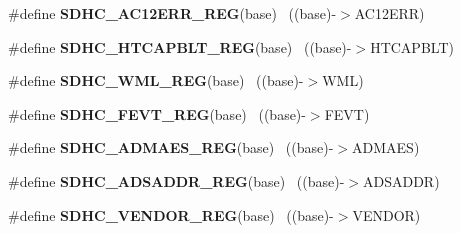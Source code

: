 \begin{DoxyCompactItemize}
\item 
\hypertarget{group___s_d_h_c___register___accessor___macros_ga56d37151a36eb2336bf5018e20649d1b}{}\#define {\bfseries S\+D\+H\+C\+\_\+\+A\+C12\+E\+R\+R\+\_\+\+R\+E\+G}(base)                                  ~((base)-\/$>$A\+C12\+E\+R\+R)\label{group___s_d_h_c___register___accessor___macros_ga56d37151a36eb2336bf5018e20649d1b}

\item 
\hypertarget{group___s_d_h_c___register___accessor___macros_gace7cb34c06d08883a5fcc5e09b5fef2e}{}\#define {\bfseries S\+D\+H\+C\+\_\+\+H\+T\+C\+A\+P\+B\+L\+T\+\_\+\+R\+E\+G}(base)                                ~((base)-\/$>$H\+T\+C\+A\+P\+B\+L\+T)\label{group___s_d_h_c___register___accessor___macros_gace7cb34c06d08883a5fcc5e09b5fef2e}

\item 
\hypertarget{group___s_d_h_c___register___accessor___macros_ga0de53147f91ba1d4d621071009e52543}{}\#define {\bfseries S\+D\+H\+C\+\_\+\+W\+M\+L\+\_\+\+R\+E\+G}(base)                                          ~((base)-\/$>$W\+M\+L)\label{group___s_d_h_c___register___accessor___macros_ga0de53147f91ba1d4d621071009e52543}

\item 
\hypertarget{group___s_d_h_c___register___accessor___macros_ga4cb98ec5c899da9be7c700ec54537a05}{}\#define {\bfseries S\+D\+H\+C\+\_\+\+F\+E\+V\+T\+\_\+\+R\+E\+G}(base)                                        ~((base)-\/$>$F\+E\+V\+T)\label{group___s_d_h_c___register___accessor___macros_ga4cb98ec5c899da9be7c700ec54537a05}

\item 
\hypertarget{group___s_d_h_c___register___accessor___macros_gab2958cbf71492c8796d3a6d6393d633a}{}\#define {\bfseries S\+D\+H\+C\+\_\+\+A\+D\+M\+A\+E\+S\+\_\+\+R\+E\+G}(base)                                    ~((base)-\/$>$A\+D\+M\+A\+E\+S)\label{group___s_d_h_c___register___accessor___macros_gab2958cbf71492c8796d3a6d6393d633a}

\item 
\hypertarget{group___s_d_h_c___register___accessor___macros_gae32c413fbc608f59a73a1298495f020e}{}\#define {\bfseries S\+D\+H\+C\+\_\+\+A\+D\+S\+A\+D\+D\+R\+\_\+\+R\+E\+G}(base)                                  ~((base)-\/$>$A\+D\+S\+A\+D\+D\+R)\label{group___s_d_h_c___register___accessor___macros_gae32c413fbc608f59a73a1298495f020e}

\item 
\hypertarget{group___s_d_h_c___register___accessor___macros_ga7e091accba9ca2dbbbae18bc8e435d2c}{}\#define {\bfseries S\+D\+H\+C\+\_\+\+V\+E\+N\+D\+O\+R\+\_\+\+R\+E\+G}(base)                                    ~((base)-\/$>$V\+E\+N\+D\+O\+R)\label{group___s_d_h_c___register___accessor___macros_ga7e091accba9ca2dbbbae18bc8e435d2c}


\end{DoxyCompactItemize}
